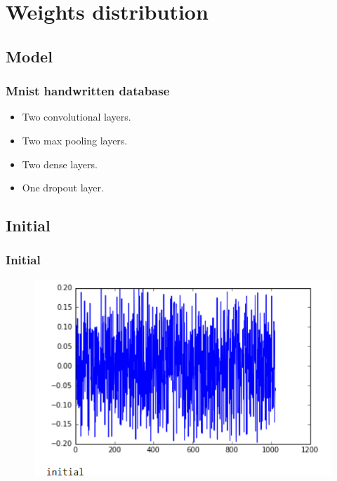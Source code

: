 \section{Weights distribution}

\subsection{Model}
\begin{frame}  
    \frametitle{Mnist handwritten database}
	\begin{itemize}
		\item Two convolutional layers.
		\item Two max pooling layers.   
		\item Two dense layers.  
		\item One dropout layer.
	\end{itemize}
\end{frame}

\subsection{Initial}
\begin{frame}
    \frametitle{Initial}
    	\begin{figure}
		\includegraphics[scale=0.3]{figure/Initial.PNG}
	\end{figure}
\end{frame}

